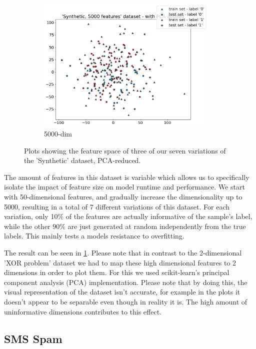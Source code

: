 \begin{figure}[h]
\begin{subfigure}[t]{0.32\textwidth}
        \includegraphics[width=0.95\textwidth]{figures/'Synthetic, 5000 features' dataset - with PCA applied.png}
        \caption{5000-dim}
    \end{subfigure}
    \caption{Plots showing the feature space of three of our seven variations of the 'Synthetic' dataset, PCA-reduced.}
    \label{fig:synthetic_plot}
\end{figure}

The amount of features in this dataset is variable which allows us to specifically isolate the impact of feature size on model runtime and performance. We start with 50-dimensional features, and gradually increase the dimensionality up to 5000, resulting in a total of 7 different variations of this dataset. For each variation, only 10\% of the features are actually informative of the sample's label, while the other 90\% are just generated at random independently from the true labels. This mainly tests a models resistance to overfitting.

The result can be seen in \ref{fig:synthetic_plot}. Please note that in contrast to the 2-dimensional 'XOR problem' dataset we had to map these high dimensional features to 2 dimensions in order to plot them. For this we used scikit-learn's principal component analysis (PCA) implementation. Please note that by doing this, the visual representation of the dataset isn't accurate, for example in the plots it doesn't appear to be separable even though in reality it is. The high amount of uninformative dimensions contributes to this effect.

\subsection{SMS Spam}

